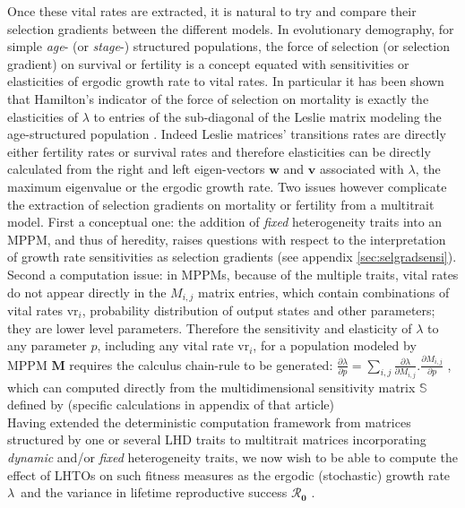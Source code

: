 \documentclass[10pt,a4paper]{article}
\newcommand{\M}{$\mathbf{M}$}
\newcommand{\lam}{$\lambda$}
\newcommand{\Rzero}{$\boldsymbol{\mathcal{R}_{0}}$  }
\begin{document}
Once these vital rates are extracted, it is natural to try and compare their selection gradients between the different models. 
In evolutionary demography, for simple \emph{age}- (or \emph{stage}-) structured populations, the force of selection (or selection gradient) on survival or fertility is a concept equated with sensitivities or elasticities of ergodic growth rate to vital rates. In particular it has been shown that Hamilton's indicator of the force of selection on mortality is exactly the elasticities of $\lambda$ to entries of the sub-diagonal of the Leslie matrix modeling the age-structured population \citep{Baudisch2005}. 
Indeed Leslie matrices' transitions rates are directly either fertility rates or survival rates and therefore elasticities can be directly calculated from the right and left eigen-vectors $\mathbf{w}$ and $\mathbf{v}$ associated with $\lambda$, the maximum eigenvalue or the ergodic growth rate.
Two issues however complicate the extraction of selection gradients on mortality or fertility from a multitrait model. First a conceptual one: the addition of \emph{fixed} heterogeneity traits into an MPPM, and thus of heredity, raises questions with respect to the interpretation of growth rate sensitivities as selection gradients (see appendix \ref{sec:selgradsensi}). Second a computation issue: in MPPMs, because of the multiple traits, vital rates do not appear directly in the $M_{i,j}$ matrix entries, which contain combinations of vital rates $\mathrm{vr}_{i}$, probability distribution of output states and other parameters; they are lower level parameters. Therefore the sensitivity and elasticity of $\lambda$ to any parameter $p$, including any vital rate $\mathrm{vr}_{i}$, for a population modeled by MPPM \M{} requires the calculus chain-rule to be generated: $\frac{\partial \lambda}{\partial p}=\sum_{i,j} \frac{\partial \lambda}{\partial M_{i,j}} . \frac{\partial M_{i,j}}{\partial p}  $ \citep{Caswell1989}, which can computed directly from the multidimensional sensitivity matrix $\mathbb{S} $ defined by \citet{Coste2017} (specific calculations in appendix of that article)\\


Having extended the deterministic computation framework from matrices structured by one or several
LHD traits to multitrait matrices incorporating \emph{dynamic} and/or \emph{fixed} heterogeneity traits, we now wish
to be able to compute the effect of LHTOs on such fitness measures as the ergodic (stochastic) growth rate \lam\ and  the variance in lifetime reproductive success \Rzero.
\end{document}
